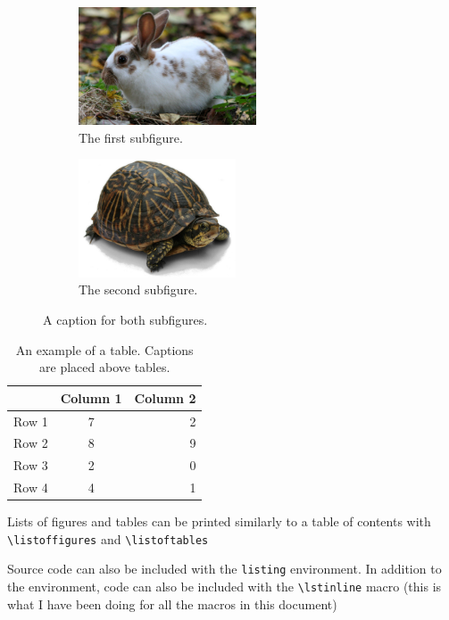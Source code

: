 \documentclass[11pt, twoside]{article}
\begin{document}
\begin{figure}[H]
    \centering
    \begin{subfigure}{0.47\textwidth}
        \centering
        \includegraphics[height=3.5cm]{figures/rabbit.jpg}
        \caption{The first subfigure.}
    \end{subfigure}
    \begin{subfigure}{0.47\textwidth}
        \centering
        \includegraphics[height=3.5cm]{figures/turtle.jpg}
        \caption{The second subfigure.}\label{fig:turtle}
    \end{subfigure}
    \caption{A caption for both subfigures.}
\end{figure}
\begin{table}[H]
    \centering
    \caption{An example of a table. Captions are placed above tables.}
    \begin{tabular}{|l|c r|}
        \hline
              & Column 1 & Column 2 \\
        \hline
        Row 1 & 7        & 2        \\
        Row 2 & 8        & 9        \\
        Row 3 & 2        & 0        \\
        Row 4 & 4        & 1        \\
        \hline
    \end{tabular}
\end{table}

Lists of figures and tables can be printed similarly to a table of contents with \lstinline{\listoffigures} and  \lstinline{\listoftables}

Source code can also be included with the \lstinline{listing} environment. In addition to the environment, code can also be included with the \lstinline{\lstinline} macro (this is what I have been doing for all the macros in this document)
\end{document}
